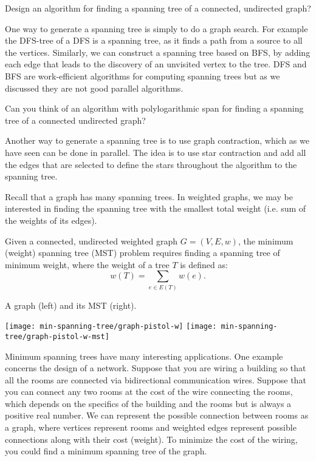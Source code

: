 \begin{question}
Design an algorithm for finding a spanning tree of a connected,
undirected graph?
\end{question}

One way to generate a spanning tree is simply to do a graph search.
For example the DFS-tree of a DFS is a spanning tree, as it finds a
path from a source to all the vertices. Similarly, we can construct a
spanning tree based on BFS, by adding each edge that leads to the
discovery of an unvisited vertex to the tree.  DFS and BFS are
work-efficient algorithms for computing spanning trees but as we
discussed they are not good parallel algorithms.
\begin{question}
Can you think of an algorithm with polylogarithmic span for finding a
spanning tree of a connected undirected graph? 
\end{question}
Another way to generate a spanning tree is to use graph contraction,
which as we have seen can be done in parallel.  The idea is to use
star contraction and add all the edges that are selected to define the
stars throughout the algorithm to the spanning tree.

Recall that a graph has many spanning trees.  In weighted graphs, we
may be interested in finding the spanning tree with the smallest total
weight (i.e. sum of the weights of its edges).

\begin{definition}
Given a connected, undirected weighted graph $G = (V,E,w)$, the
minimum (weight) spanning tree (MST) problem requires finding a
spanning tree of minimum weight, where the weight of a tree $T$ is
defined as:
\[
w(T) = \sum_{e \in E(T)} w(e).
\]
\end{definition}

\begin{example}
A graph (left) and its MST (right). 
\begin{center}
\texttt{[image: min-spanning-tree/graph-pistol-w]}
%
\hspace{1in}
%
\texttt{[image: min-spanning-tree/graph-pistol-w-mst]}
\end{center}
\end{example}



\begin{example}
\label{ex:mst::network-design}
Minimum spanning trees have many interesting applications. One example
concerns the design of a network.  Suppose that you are wiring a
building so that all the rooms are connected via bidirectional
communication wires.  Suppose that you can connect any two rooms at
the cost of the wire connecting the rooms, which depends on the
specifics of the building and the rooms but is always a positive real
number.  We can represent the possible connection between rooms as a
graph, where vertices represent rooms and weighted edges represent
possible connections along with their cost (weight).  To minimize the
cost of the wiring, you could find a minimum spanning tree of the
graph.  

\end{example}

